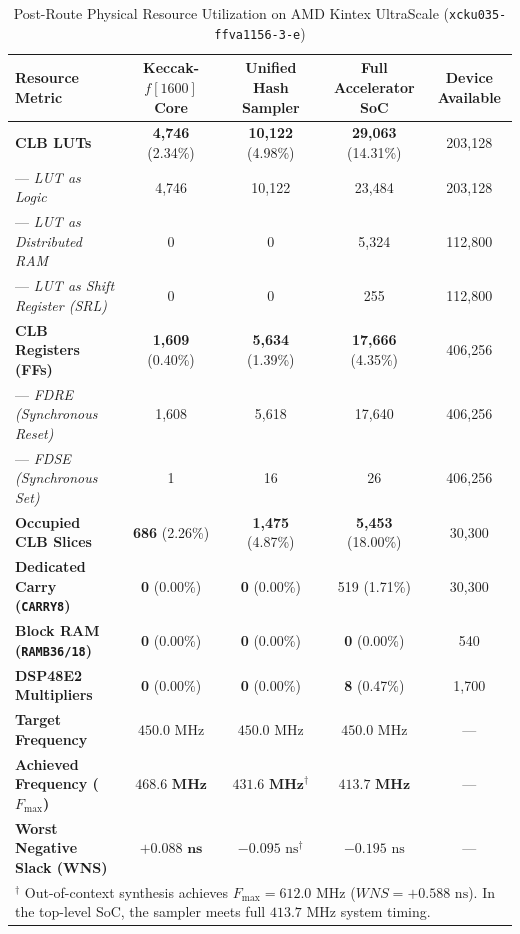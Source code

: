 \begin{table}[!t]
\caption{Post-Route Physical Resource Utilization on AMD Kintex UltraScale (\texttt{xcku035-ffva1156-3-e})}
\label{tab:fpga_utilization}
\centering
\footnotesize
\begin{tabular*}{\textwidth}{@{\extracolsep{\fill}} lcccc @{}}
\toprule
\textbf{Resource Metric} & \textbf{Keccak-$f[1600]$ Core} & \textbf{Unified Hash Sampler} & \textbf{Full Accelerator SoC} & \textbf{Device Available} \\
\midrule
\textbf{CLB LUTs}               & \textbf{4,746} (2.34\%)  & \textbf{10,122} (4.98\%)  & \textbf{29,063} (14.31\%) & 203,128 \\
--- \textit{LUT as Logic}       & 4,746                    & 10,122                    & 23,484                    & 203,128 \\
--- \textit{LUT as Distributed RAM} & 0                    & 0                         & 5,324                     & 112,800 \\
--- \textit{LUT as Shift Register (SRL)} & 0               & 0                         & 255                       & 112,800 \\
\textbf{CLB Registers (FFs)}    & \textbf{1,609} (0.40\%)  & \textbf{5,634} (1.39\%)   & \textbf{17,666} (4.35\%)  & 406,256 \\
--- \textit{FDRE (Synchronous Reset)} & 1,608              & 5,618                     & 17,640                    & 406,256 \\
--- \textit{FDSE (Synchronous Set)}   & 1                  & 16                        & 26                        & 406,256 \\
\textbf{Occupied CLB Slices}    & \textbf{686} (2.26\%)    & \textbf{1,475} (4.87\%)   & \textbf{5,453} (18.00\%)  & 30,300 \\
\textbf{Dedicated Carry (\texttt{CARRY8})} & \textbf{0} (0.00\%) & \textbf{0} (0.00\%)   & 519 (1.71\%)              & 30,300 \\
\textbf{Block RAM (\texttt{RAMB36/18})}    & \textbf{0} (0.00\%) & \textbf{0} (0.00\%)   & \textbf{0} (0.00\%)       & 540 \\
\textbf{DSP48E2 Multipliers}    & \textbf{0} (0.00\%)      & \textbf{0} (0.00\%)       & \textbf{8} (0.47\%)       & 1,700 \\
\midrule
\textbf{Target Frequency}       & $450.0\text{ MHz}$       & $450.0\text{ MHz}$        & $450.0\text{ MHz}$        & --- \\
\textbf{Achieved Frequency ($F_{\max}$)} & $\mathbf{468.6\text{ MHz}}$ & $\mathbf{431.6\text{ MHz}}^\dagger$ & $\mathbf{413.7\text{ MHz}}$ & --- \\
\textbf{Worst Negative Slack (WNS)} & $\mathbf{+0.088\text{ ns}}$ & $-0.095\text{ ns}^\dagger$ & $-0.195\text{ ns}$ & --- \\
\bottomrule
\multicolumn{5}{l}{\scriptsize $^\dagger$ Out-of-context synthesis achieves $F_{\max} = 612.0\text{ MHz}$ ($WNS = +0.588\text{ ns}$). In the top-level SoC, the sampler meets full $413.7\text{ MHz}$ system timing.}
\end{tabular*}
\end{table}

